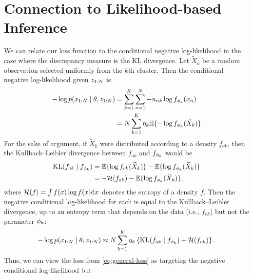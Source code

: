\section{Connection to Likelihood-based Inference} \label{sec:connection-to-likelihood}

We can relate our loss function to the conditional negative log-likelihood in the case where the discrepancy measure is the KL divergence.
Let $\widetilde{X}_{k}$ be a random observation selected uniformly from the $k$th cluster.
Then the conditional negative log-likelihood given $z_{1:N}$ is
\begin{align}
	-\log p(x_{1:\numobs} \mid \theta, z_{1:\numobs})
	 & = \sum_{k=1}^{\numcomps}\sum_{n=1}^N - u_{nk}\log f_{\param_{k}}(x_n)      \\
	 & = N \sum_{k=1}^{\numcomps} \eta_{k} \E\{-\log f_{\param_{k}}(\widetilde X_{k})\}
\end{align}
For the sake of argument, if $\widetilde{X}_{k}$ were distributed according to a density $f_{ok}$, then
the Kullback--Leibler divergence between $f_{ok}$ and $f_{\phi_{k}}$ would be
\[
	\begin{aligned}
		\kl{f_{ok}}{ f_{\param_{k}}}
		 & = \E\{\log f_{ok}(\widetilde X_{k})\} -  \E\{\log f_{\param_{k}}(\widetilde X_{k})\} \\
		 & = -\mathcal{H}(f_{ok}) -  \E\{\log f_{\param_{k}}(\widetilde X_{k})\},
	\end{aligned}
\]
where $\mathcal{H}(f) = \int f(x) \log f(x) \mathrm{d} x$ denotes the entropy of a density $f$.
Then the negative conditional log-likelihood for each is equal to the Kullback--Leibler divergence, up to an entropy term that depends on the data (i.e., $f_{ok}$) but not the parameter $\phi_{k}$:
\[
	-\log p(x_{1:N} \mid \theta, z_{1:N})
	\approx N \sum_{k=1}^{K}\eta_k\left\{ \mathrm{KL}(f_{ok} \mid  f_{\phi_{k}}) + \mathcal{H}(f_{ok})\right\}.
\]
Thus, we can view the loss from \cref{eq:general-loss} as targeting the negative conditional log-likelihood but
